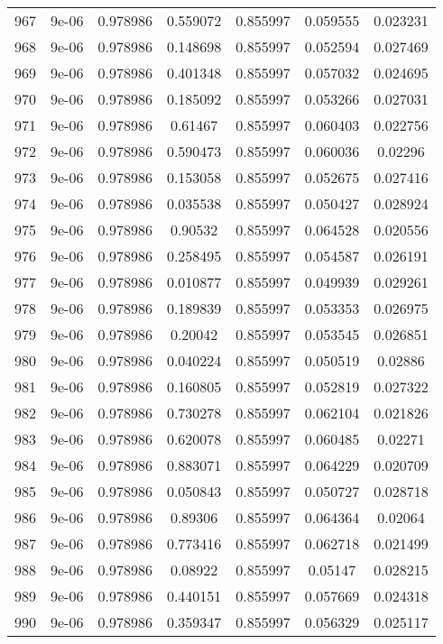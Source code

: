 \begin{table}
\begin{tabular*}{\linewidth}{c|c|c|c|c|c|c}
967 & 9e-06 & 0.978986 & 0.559072 & 0.855997 & 0.059555 & 0.023231\\
968 & 9e-06 & 0.978986 & 0.148698 & 0.855997 & 0.052594 & 0.027469\\
969 & 9e-06 & 0.978986 & 0.401348 & 0.855997 & 0.057032 & 0.024695\\
970 & 9e-06 & 0.978986 & 0.185092 & 0.855997 & 0.053266 & 0.027031\\
971 & 9e-06 & 0.978986 & 0.61467 & 0.855997 & 0.060403 & 0.022756\\
972 & 9e-06 & 0.978986 & 0.590473 & 0.855997 & 0.060036 & 0.02296\\
973 & 9e-06 & 0.978986 & 0.153058 & 0.855997 & 0.052675 & 0.027416\\
974 & 9e-06 & 0.978986 & 0.035538 & 0.855997 & 0.050427 & 0.028924\\
975 & 9e-06 & 0.978986 & 0.90532 & 0.855997 & 0.064528 & 0.020556\\
976 & 9e-06 & 0.978986 & 0.258495 & 0.855997 & 0.054587 & 0.026191\\
977 & 9e-06 & 0.978986 & 0.010877 & 0.855997 & 0.049939 & 0.029261\\
978 & 9e-06 & 0.978986 & 0.189839 & 0.855997 & 0.053353 & 0.026975\\
979 & 9e-06 & 0.978986 & 0.20042 & 0.855997 & 0.053545 & 0.026851\\
980 & 9e-06 & 0.978986 & 0.040224 & 0.855997 & 0.050519 & 0.02886\\
981 & 9e-06 & 0.978986 & 0.160805 & 0.855997 & 0.052819 & 0.027322\\
982 & 9e-06 & 0.978986 & 0.730278 & 0.855997 & 0.062104 & 0.021826\\
983 & 9e-06 & 0.978986 & 0.620078 & 0.855997 & 0.060485 & 0.02271\\
984 & 9e-06 & 0.978986 & 0.883071 & 0.855997 & 0.064229 & 0.020709\\
985 & 9e-06 & 0.978986 & 0.050843 & 0.855997 & 0.050727 & 0.028718\\
986 & 9e-06 & 0.978986 & 0.89306 & 0.855997 & 0.064364 & 0.02064\\
987 & 9e-06 & 0.978986 & 0.773416 & 0.855997 & 0.062718 & 0.021499\\
988 & 9e-06 & 0.978986 & 0.08922 & 0.855997 & 0.05147 & 0.028215\\
989 & 9e-06 & 0.978986 & 0.440151 & 0.855997 & 0.057669 & 0.024318\\
990 & 9e-06 & 0.978986 & 0.359347 & 0.855997 & 0.056329 & 0.025117\\
\end{tabular*}
\end{table}
